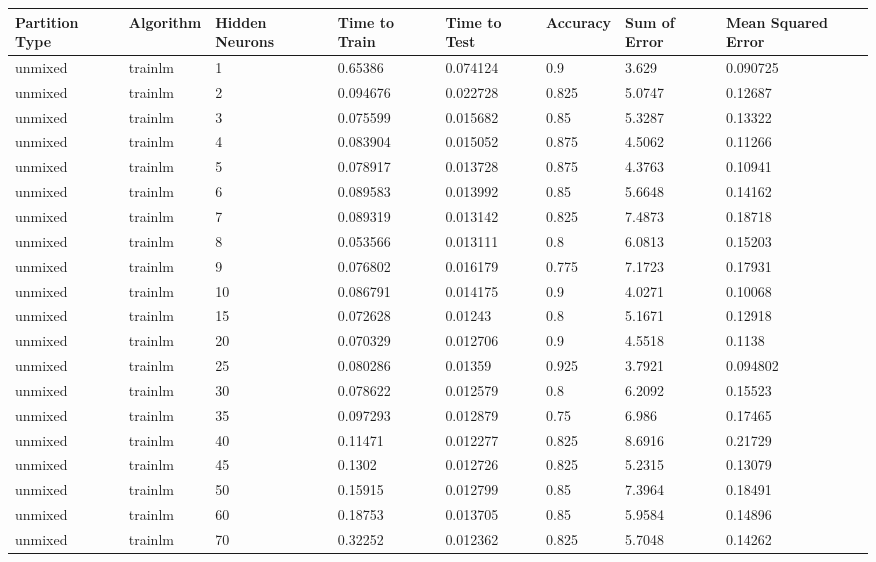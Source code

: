 \begin{longtable}{llllllll}
Partition Type & Algorithm & Hidden Neurons & Time to Train & Time to Test & Accuracy & Sum of Error & Mean Squared Error \\ \hline 
unmixed & trainlm & 1 & 0.65386 & 0.074124 & 0.9 & 3.629 & 0.090725 \\ \hline 
unmixed & trainlm & 2 & 0.094676 & 0.022728 & 0.825 & 5.0747 & 0.12687 \\ \hline 
unmixed & trainlm & 3 & 0.075599 & 0.015682 & 0.85 & 5.3287 & 0.13322 \\ \hline 
unmixed & trainlm & 4 & 0.083904 & 0.015052 & 0.875 & 4.5062 & 0.11266 \\ \hline 
unmixed & trainlm & 5 & 0.078917 & 0.013728 & 0.875 & 4.3763 & 0.10941 \\ \hline 
unmixed & trainlm & 6 & 0.089583 & 0.013992 & 0.85 & 5.6648 & 0.14162 \\ \hline 
unmixed & trainlm & 7 & 0.089319 & 0.013142 & 0.825 & 7.4873 & 0.18718 \\ \hline 
unmixed & trainlm & 8 & 0.053566 & 0.013111 & 0.8 & 6.0813 & 0.15203 \\ \hline 
unmixed & trainlm & 9 & 0.076802 & 0.016179 & 0.775 & 7.1723 & 0.17931 \\ \hline 
unmixed & trainlm & 10 & 0.086791 & 0.014175 & 0.9 & 4.0271 & 0.10068 \\ \hline 
unmixed & trainlm & 15 & 0.072628 & 0.01243 & 0.8 & 5.1671 & 0.12918 \\ \hline 
unmixed & trainlm & 20 & 0.070329 & 0.012706 & 0.9 & 4.5518 & 0.1138 \\ \hline 
unmixed & trainlm & 25 & 0.080286 & 0.01359 & 0.925 & 3.7921 & 0.094802 \\ \hline 
unmixed & trainlm & 30 & 0.078622 & 0.012579 & 0.8 & 6.2092 & 0.15523 \\ \hline 
unmixed & trainlm & 35 & 0.097293 & 0.012879 & 0.75 & 6.986 & 0.17465 \\ \hline 
unmixed & trainlm & 40 & 0.11471 & 0.012277 & 0.825 & 8.6916 & 0.21729 \\ \hline 
unmixed & trainlm & 45 & 0.1302 & 0.012726 & 0.825 & 5.2315 & 0.13079 \\ \hline 
unmixed & trainlm & 50 & 0.15915 & 0.012799 & 0.85 & 7.3964 & 0.18491 \\ \hline 
unmixed & trainlm & 60 & 0.18753 & 0.013705 & 0.85 & 5.9584 & 0.14896 \\ \hline 
unmixed & trainlm & 70 & 0.32252 & 0.012362 & 0.825 & 5.7048 & 0.14262 \\ \hline 

\end{longtable}
